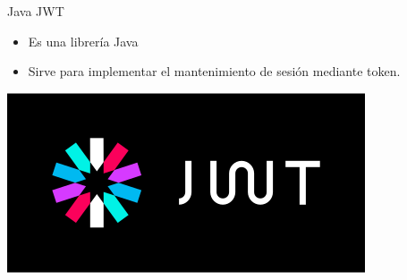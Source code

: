 \documentclass{beamer}
\begin{document}
            \begin{frame}{Java JWT}
                \begin{minipage}{0.70\textwidth}
                    \begin{itemize}
                        \item Es una librería Java
                        \item Sirve para implementar el mantenimiento de sesión mediante token.
                    \end{itemize}
                \end{minipage}
                \begin{minipage}{0.25\textwidth}
                    \includegraphics[width=\textwidth]{res/logo-jwt}
                \end{minipage}
            \end{frame}
\end{document}
